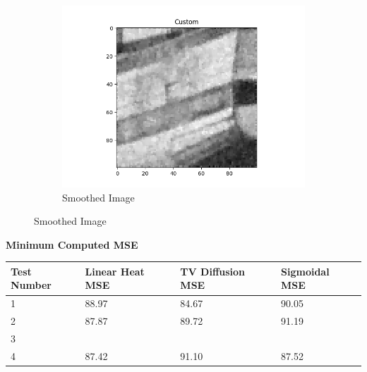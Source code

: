 \documentclass{article}
\begin{document}
\begin{center}
\begin{figure}[!htb]
\begin{center}
        \begin{subfigure}[b]{0.3\textwidth}
          \includegraphics[width=\textwidth]{../generated_images/Custom_test4.png}
          \caption{Smoothed Image}
        \end{subfigure}
      \end{center}
    \end{figure}
  \end{center}

  \newpage
  \noindent
  \textbf{Minimum Computed MSE}
  \begin{table}[h]
    \begin{tabular}{|l|l|ll|lllll|}
    \hline
    Test Number & Linear Heat MSE & \multicolumn{2}{l|}{TV Diffusion MSE} & \multicolumn{5}{l|}{Sigmoidal MSE}  \\ \hline
    1           &  88.97          & \multicolumn{2}{l|}{84.67}            & \multicolumn{5}{l|}{90.05}          \\ \hline
    2           &  87.87          & \multicolumn{2}{l|}{89.72}            & \multicolumn{5}{l|}{91.19}          \\ \hline
    3           &                 & \multicolumn{2}{l|}{}                 & \multicolumn{5}{l|}{}               \\ \hline
    4           &  87.42          & \multicolumn{2}{l|}{91.10}            & \multicolumn{5}{l|}{87.52}          \\ \hline
    \end{tabular}
    \end{table}
\end{document}
